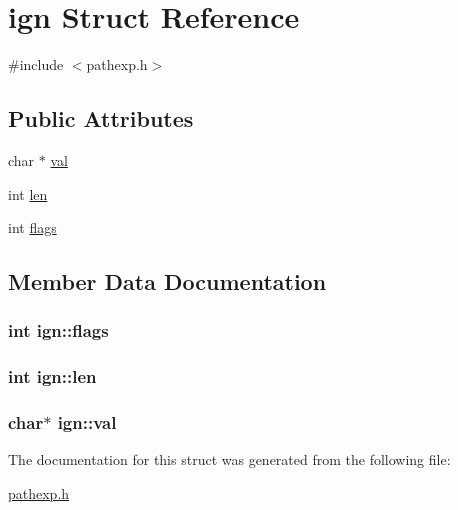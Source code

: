 \hypertarget{structign}{}\section{ign Struct Reference}
\label{structign}


{\ttfamily \#include $<$pathexp.\+h$>$}

\subsection*{Public Attributes}
\begin{DoxyCompactItemize}
\item 
char $\ast$ \hyperlink{structign_a534c8733717c56d8872de43019089ade}{val}
\item 
int \hyperlink{structign_a4f5a326628d04a43015f7e8bb018301b}{len}
\item 
int \hyperlink{structign_a3fdd7e30b97f47f2da8d5f3c8ea35c80}{flags}
\end{DoxyCompactItemize}


\subsection{Member Data Documentation}
\subsubsection[{\texorpdfstring{flags}{flags}}]{\setlength{\rightskip}{0pt plus 5cm}int ign\+::flags}\hypertarget{structign_a3fdd7e30b97f47f2da8d5f3c8ea35c80}{}\label{structign_a3fdd7e30b97f47f2da8d5f3c8ea35c80}
\subsubsection[{\texorpdfstring{len}{len}}]{\setlength{\rightskip}{0pt plus 5cm}int ign\+::len}\hypertarget{structign_a4f5a326628d04a43015f7e8bb018301b}{}\label{structign_a4f5a326628d04a43015f7e8bb018301b}
\subsubsection[{\texorpdfstring{val}{val}}]{\setlength{\rightskip}{0pt plus 5cm}char$\ast$ ign\+::val}\hypertarget{structign_a534c8733717c56d8872de43019089ade}{}\label{structign_a534c8733717c56d8872de43019089ade}


The documentation for this struct was generated from the following file\+:\begin{DoxyCompactItemize}
\item 
\hyperlink{pathexp_8h}{pathexp.\+h}\end{DoxyCompactItemize}
